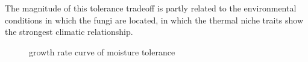 \documentclass[12pt]{article}
\begin{document}
The magnitude of this tolerance tradeoff is partly related to the environmental conditions in which the fungi are located, in which the thermal niche traits show the strongest climatic relationship.
\begin{figure}[h]
	\centering
	\caption{growth rate curve of moisture tolerance}
	\label{figure:moisture_tolerance_growth_rate}
\end{figure}
\end{document}
